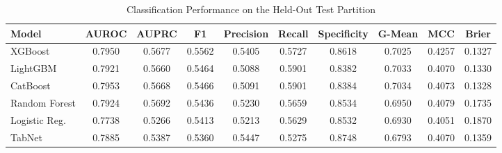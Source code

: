 \begin{table}
\centering
\caption{Classification Performance on the Held-Out Test Partition}
\label{tab:results}
\begin{tabular}{lccccccccc}
\toprule
Model & AUROC & AUPRC & F1 & Precision & Recall & Specificity & G-Mean & MCC & Brier \\
\midrule
XGBoost & 0.7950 & 0.5677 & 0.5562 & 0.5405 & 0.5727 & 0.8618 & 0.7025 & 0.4257 & 0.1327 \\
LightGBM & 0.7921 & 0.5660 & 0.5464 & 0.5088 & 0.5901 & 0.8382 & 0.7033 & 0.4070 & 0.1330 \\
CatBoost & 0.7953 & 0.5668 & 0.5466 & 0.5091 & 0.5901 & 0.8384 & 0.7034 & 0.4073 & 0.1328 \\
Random Forest & 0.7924 & 0.5692 & 0.5436 & 0.5230 & 0.5659 & 0.8534 & 0.6950 & 0.4079 & 0.1735 \\
Logistic Reg. & 0.7738 & 0.5266 & 0.5413 & 0.5213 & 0.5629 & 0.8532 & 0.6930 & 0.4051 & 0.1870 \\
TabNet & 0.7885 & 0.5387 & 0.5360 & 0.5447 & 0.5275 & 0.8748 & 0.6793 & 0.4070 & 0.1359 \\
\bottomrule
\end{tabular}
\end{table}
